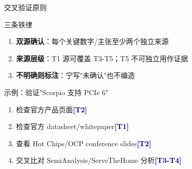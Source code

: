 \documentclass[UTF8,11pt,aspectratio=169]{beamer}
\newcommand{\sourcecat}[1]{\textcolor{darkblue}{\textbf{#1}}}
\begin{document}
\begin{frame}{交叉验证原则}
    \begin{block}{三条铁律}
        \begin{enumerate}
            \item \textbf{双源确认}：每个关键数字/主张至少两个独立来源
            \item \textbf{来源层级}：T1 源可覆盖 T3-T5；T5 不可独立用作证据
            \item \textbf{不明确则标注}：宁写"未确认"也不编造
        \end{enumerate}
    \end{block}

    \vspace{0.3cm}
    \begin{exampleblock}{示例：验证"Scorpio 支持 PCIe 6"}
        \begin{enumerate}
            \item 检查官方产品页面\sourcecat{[T2]}
            \item 检查官方 datasheet/whitepaper\sourcecat{[T1]}
            \item 查看 Hot Chips/OCP conference slides\sourcecat{[T2]}
            \item 交叉比对 SemiAnalysis/ServeTheHome 分析\sourcecat{[T3-T4]}
        \end{enumerate}
    \end{exampleblock}
\end{frame}
\end{document}
